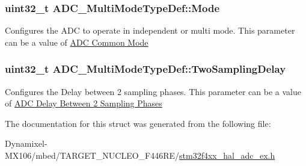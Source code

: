 \subsubsection[{\texorpdfstring{Mode}{Mode}}]{\setlength{\rightskip}{0pt plus 5cm}uint32\+\_\+t A\+D\+C\+\_\+\+Multi\+Mode\+Type\+Def\+::\+Mode}\hypertarget{struct_a_d_c___multi_mode_type_def_a424b5606c9d5dfbfdc850080d34552ff}{}\label{struct_a_d_c___multi_mode_type_def_a424b5606c9d5dfbfdc850080d34552ff}
Configures the A\+DC to operate in independent or multi mode. This parameter can be a value of \hyperlink{group___a_d_c_ex___common__mode}{A\+DC Common Mode} 
\subsubsection[{\texorpdfstring{Two\+Sampling\+Delay}{TwoSamplingDelay}}]{\setlength{\rightskip}{0pt plus 5cm}uint32\+\_\+t A\+D\+C\+\_\+\+Multi\+Mode\+Type\+Def\+::\+Two\+Sampling\+Delay}\hypertarget{struct_a_d_c___multi_mode_type_def_a5590cc138c49a97c6433caa29592cd1b}{}\label{struct_a_d_c___multi_mode_type_def_a5590cc138c49a97c6433caa29592cd1b}
Configures the Delay between 2 sampling phases. This parameter can be a value of \hyperlink{group___a_d_c__delay__between__2__sampling__phases}{A\+DC Delay Between 2 Sampling Phases} 

The documentation for this struct was generated from the following file\+:\begin{DoxyCompactItemize}
\item 
Dynamixel-\/\+M\+X106/mbed/\+T\+A\+R\+G\+E\+T\+\_\+\+N\+U\+C\+L\+E\+O\+\_\+\+F446\+R\+E/\hyperlink{stm32f4xx__hal__adc__ex_8h}{stm32f4xx\+\_\+hal\+\_\+adc\+\_\+ex.\+h}\end{DoxyCompactItemize}

